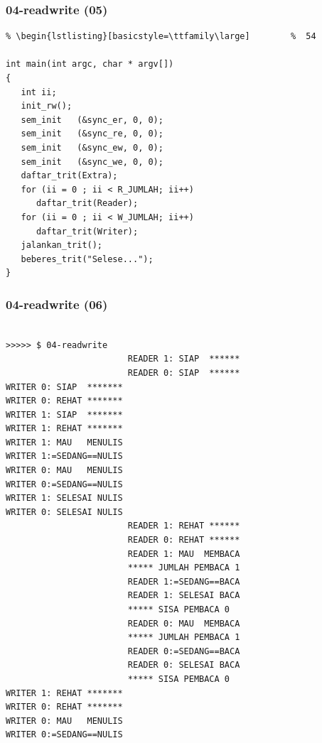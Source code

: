 \documentclass[xcolor=table, notheorems, hyperref={pdfpagelabels=false}]{beamer}
\begin{document}
\begin{frame}[fragile]
\frametitle{04-readwrite (05)}
\begin{lstlisting}[basicstyle=\ttfamily\footnotesize] %  72
% \begin{lstlisting}[basicstyle=\ttfamily\small]        %  65
% \begin{lstlisting}[basicstyle=\ttfamily\large]        %  54

int main(int argc, char * argv[])
{
   int ii;
   init_rw();
   sem_init   (&sync_er, 0, 0);
   sem_init   (&sync_re, 0, 0);
   sem_init   (&sync_ew, 0, 0);
   sem_init   (&sync_we, 0, 0);
   daftar_trit(Extra);
   for (ii = 0 ; ii < R_JUMLAH; ii++)
      daftar_trit(Reader);
   for (ii = 0 ; ii < W_JUMLAH; ii++)
      daftar_trit(Writer);
   jalankan_trit();
   beberes_trit("Selese...");
}

\end{lstlisting}
\end{frame}

\begin{frame}[fragile]
\frametitle{04-readwrite (06)}
\begin{lstlisting}[basicstyle=\ttfamily\tiny]

>>>>> $ 04-readwrite 
                        READER 1: SIAP  ******
                        READER 0: SIAP  ******
WRITER 0: SIAP  *******
WRITER 0: REHAT *******
WRITER 1: SIAP  *******
WRITER 1: REHAT *******
WRITER 1: MAU   MENULIS
WRITER 1:=SEDANG==NULIS
WRITER 0: MAU   MENULIS
WRITER 0:=SEDANG==NULIS
WRITER 1: SELESAI NULIS
WRITER 0: SELESAI NULIS
                        READER 1: REHAT ******
                        READER 0: REHAT ******
                        READER 1: MAU  MEMBACA
                        ***** JUMLAH PEMBACA 1
                        READER 1:=SEDANG==BACA
                        READER 1: SELESAI BACA
                        ***** SISA PEMBACA 0
                        READER 0: MAU  MEMBACA
                        ***** JUMLAH PEMBACA 1
                        READER 0:=SEDANG==BACA
                        READER 0: SELESAI BACA
                        ***** SISA PEMBACA 0
WRITER 1: REHAT *******
WRITER 0: REHAT *******
WRITER 0: MAU   MENULIS
WRITER 0:=SEDANG==NULIS

\end{lstlisting}
\end{frame}
\end{document}
